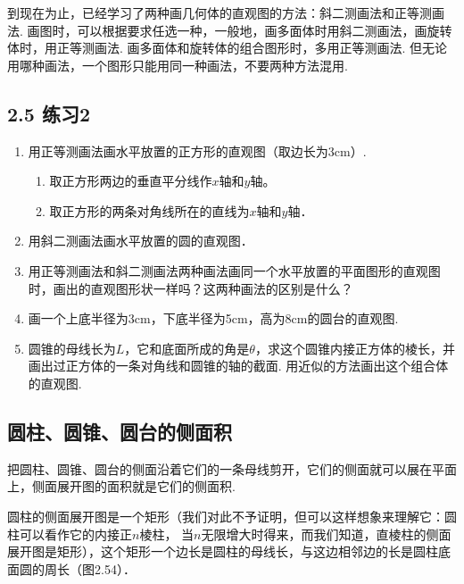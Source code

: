\begin{rmk}
    到现在为止，已经学习了两种画几何体的直观图的方法：斜二测画法和正等测画法. 画图时，可以根据要求任选一种，一般地，画多面体时用斜二测画法，画旋转体时，用正等测画法. 画多面体和旋转体的组合图形时，多用正等测画法. 但无论用哪种画法，一个图形只能用同一种画法，不要两种方法混用.
\end{rmk}

\subsection*{2.5 练习2}
\begin{enumerate}
\item 用正等测画法画水平放置的正方形的直观图（取边长为3cm）.
\begin{enumerate}[(1)]
\item 取正方形两边的垂直平分线作$x$轴和$y$轴。
\item 取正方形的两条对角线所在的直线为$x$轴和$y$轴．
\end{enumerate}

\item 用斜二测画法画水平放置的圆的直观图．
\item 用正等测画法和斜二测画法两种画法画同一个水平放置的平面图形的直观图时，画出的直观图形状一样吗？这两种画法的区别是什么？
\item 画一个上底半径为3cm，下底半径为5cm，高为8cm的圆台的直观图.
\item 圆锥的母线长为$L$，它和底面所成的角是$\theta$，求这个圆锥内接正方体的棱长，并画出过正方体的一条对角线和圆锥的轴的截面. 用近似的方法画出这个组合体的直观图.
\end{enumerate}

\subsection{圆柱、圆锥、圆台的侧面积}
把圆柱、圆锥、圆台的侧面沿着它们的一条母线剪开，它们的侧面就可以展在平面上，侧面展开图的面积就是它们的侧面积.

圆柱的侧面展开图是一个矩形（我们对此不予证明，但可以这样想象来理解它：圆柱可以看作它的内接正$n$棱柱，
当$n$无限增大时得来，而我们知道，直棱柱的侧面展开图是矩形），这个矩形一个边长是圆柱的母线长，与这边相邻边的长是圆柱底面圆的周长（图2.54）．

